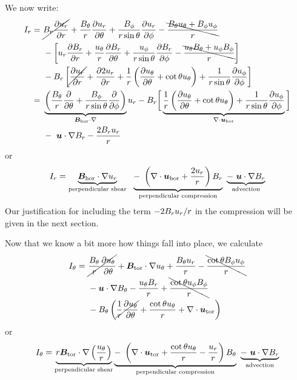 \documentclass[12pt]{article}
\newcommand{\uhor}{\vecu_{\rm{hor}}}
\newcommand{\utor}{\vecu_{\rm{tor}}}
\newcommand{\bhor}{\vecb_{\rm{hor}}}
\newcommand{\btor}{\vecb_{\rm{tor}}}
\begin{document}
We now write:
\begin{align*}
	I_r =\ &\cancel{\br\pderiv{\ur}{r}}   +   \frac{\bt}{r}\pderiv{\ur}{\theta}   +   \frac{\bp}{\rsint}\pderiv{\ur}{\phi}   -   \bcancel{    \frac{\bt\ut+\bp\up}{r}   }\\
	&-\left[   \ur\pderiv{\br}{r}   +   \frac{\ut}{r}\pderiv{\br}{\theta}   +   \frac{\up}{\rsint}\pderiv{\br}{\phi}   -   \bcancel{    \frac{\ut\bt+\up\bp}{r}   }   \right]\\
	&- B_r\left[   \cancel{\pderiv{\ur}{r}}   +    \pderiv{2\ur}{r}   +   \frac{1}{r}\left(  \pderiv{\ut}{\theta}  + \cot\theta\ut  \right)   +   \orsint\pderiv{\up}{\phi}   \right]\\
	=\  &  \underbrace{  \left(   \frac{\bt}{r}\pderiv{}{\theta}  +  \frac{\bp}{\rsint}\pderiv{}{\phi}   \right) }_{\bhor\dotgrad} \ur   - 
	  \br \bigg{[}  \underbrace{  \frac{1}{r} \left(  \pderiv{\ut}{\theta} + \cot\theta\ut  \right) + \orsint \pderiv{\up}{\phi} }_{\Div\uhor}  \bigg{]}\\
	  &-\ \ugrad\br - \frac{2\br\ur}{r}
\end{align*}
or
\begin{align}
	I_r = \underbrace{\bhor\dotgrad\ur}_{\text{perpendicular shear}}\ \ 
	\underbrace{-\ \left(  \Div\uhor + \frac{2\ur}{r}  \right) \br}_{\text{perpendicular compression}} \ 
	\underbrace{-\ \ugrad\br}_{\text{advection}}
\end{align}
Our justification for including the term $-2B_ru_r/r$ in the compression will be given in the next section. 

Now that we know a bit more how things fall into place, we calculate
\begin{align*}
	I_\theta =\ &\cancel{  \frac{\bt}{r}\pderiv{\ut}{\theta}  } + \btor\dotgrad\ut + \frac{\bt\ur}{r} - \bcancel{\frac{\cot\theta \bp\up}{r}}\\
	&-\ugrad\bt -  \frac{\ut\br}{r} + \bcancel{\frac{\cot\theta\up\bp}{r} }\\
	& - \bt\left(   \cancel{\frac{1}{r}\pderiv{\ut}{\theta}} + \frac{\cot\theta\ut}{r} + \Div\utor   \right)
\end{align*}
or
\begin{align}
	I_\theta = \underbrace{r\btor\dotgrad \left(\frac{\ut}{r}\right) }_{\text{perpendicular shear}} 
	\underbrace{-\ \left(  \Div\utor +\frac{\cot\theta\ut}{r} - \frac{\ur}{r}  \right) \bt}_{\text{perpendicular compression}} \ 
	\underbrace{-\ \ugrad\br}_{\text{advection}}
\end{align}
\end{document}
